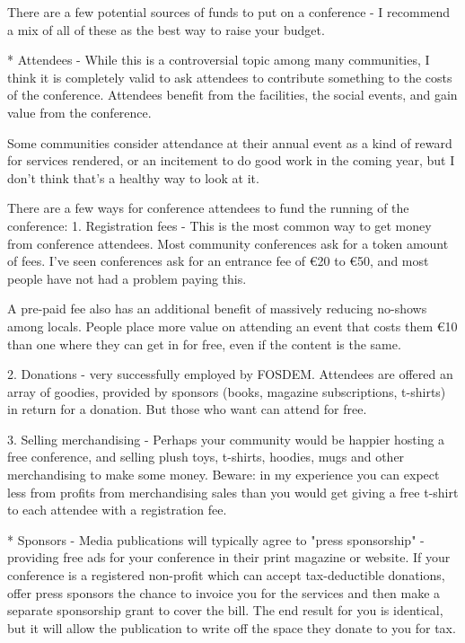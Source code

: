 There are a few potential sources of funds to put on a conference - I
recommend a mix of all of these as the best way to raise your budget.

       * Attendees - While this is a controversial topic among many
communities, I think it is completely valid to ask attendees to
contribute something to the costs of the conference. Attendees benefit
from the facilities, the social events, and gain value from the conference.

       Some communities consider attendance at their annual event as a kind of
reward for services rendered, or an incitement to do good work in the
coming year, but I don't think that's a healthy way to look at it.

       There are a few ways for conference attendees to fund the running of
the conference:
               1. Registration fees - This is the most common way to get money from
conference attendees. Most community conferences ask for a token amount
of fees. I've seen conferences ask for an entrance fee of €20 to €50,
and most people have not had a problem paying this.

               A pre-paid fee also has an additional benefit of massively reducing
no-shows among locals. People place more value on attending an event
that costs them €10 than one where they can get in for free, even if the
content is the same.

               2. Donations - very successfully employed by FOSDEM. Attendees are
offered an array of goodies, provided by sponsors (books, magazine
subscriptions, t-shirts) in return for a donation. But those who want
can attend for free.

               3. Selling merchandising - Perhaps your community would be happier
hosting a free conference, and selling plush toys, t-shirts, hoodies,
mugs and other merchandising to make some money. Beware: in my
experience you can expect less from profits from merchandising sales
than you would get giving a free t-shirt to each attendee with a
registration fee.

       * Sponsors - Media publications will typically agree to "press
sponsorship" - providing free ads for your conference in their print
magazine or website. If your conference is a registered non-profit which
can accept tax-deductible donations, offer press sponsors the chance to
invoice you for the services and then make a separate sponsorship grant
to cover the bill. The end result for you is identical, but it will
allow the publication to write off the space they donate to you for tax.


